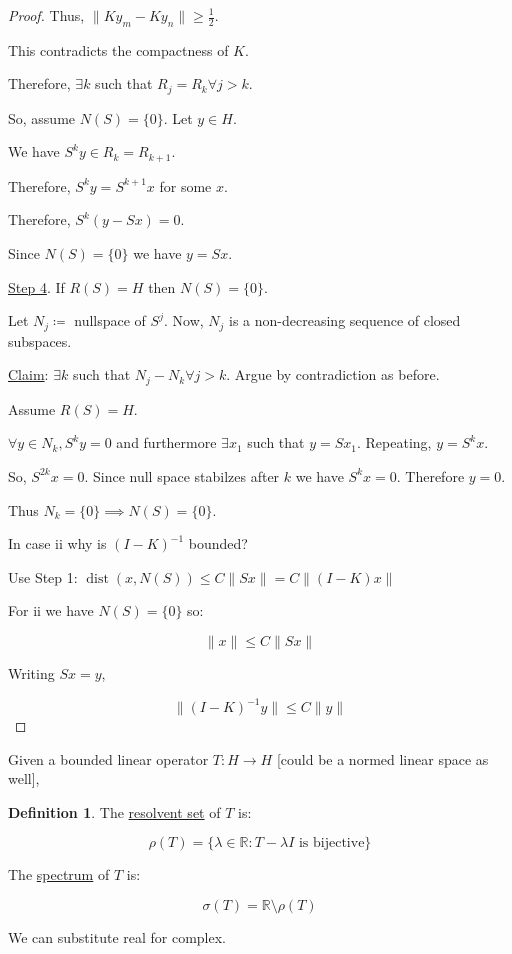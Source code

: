 \documentclass{article}
\theoremstyle{definition}
\newtheorem{definition}{Definition}
\begin{document}
\begin{proof}
Thus, \(\lVert K y_m - K y_n \rVert \geq \frac{1}{2}\).

This contradicts the compactness of \(K\). 

Therefore, \(\exists k\) such that \(R_j = R_k \forall j > k\).

So, assume \(N(S) = \{ 0 \}\). Let \(y\in H\).

We have \(S^k y \in R_k = R_{k+1}\).

Therefore, \(S^k y = S^{k+1}x\) for some \(x\).

Therefore, \(S^k (y - S x) = 0\).

Since \(N(S)=\{ 0 \}\) we have \(y = S x\).

\underline{Step 4}. If \(R(S) = H\) then \(N(S) = \{ 0 \} \).

Let \(N_j \coloneqq\) nullspace of \(S^j\). Now, \(N_j\) is a non-decreasing sequence of closed subspaces.

\underline{Claim}: \(\exists k\) such that \(N_j - N_k \forall j > k\). Argue by contradiction as before.

Assume \(R(S)=H\).

\(\forall y\in N_k, S^k y = 0\) and furthermore \(\exists x_1\) such that \(y=S x_1\). Repeating, \(y = S^{k} x\).

So, \(S^{2k} x = 0\). Since null space stabilzes after \(k\) we have \(S^k x = 0\). Therefore \(y = 0\).

Thus \(N_k = \{ 0 \} \implies N(S) = \{ 0 \}\).

In case ii why is \((I - K) ^{-1} \) bounded?

Use Step 1: \(\operatorname{dist}(x, N(S)) \leq C \lVert Sx \rVert = C \lVert (I-K)x \rVert  \) 

For ii we have \(N(S)= \{ 0 \} \) so:

\[
    \lVert x \rVert \leq C \lVert S x \rVert 
\]

Writing \(S x = y\),

\[
    \lVert (I - K)^{-1} y \rVert \leq C \lVert y \rVert 
\]

\end{proof}

Given a bounded linear operator \(T: H \to H\) [could be a normed linear space as well],

\begin{definition}
    The \underline{resolvent set} of \(T\) is:
    
    \[
        \rho(T) = \{ \lambda \in \mathbb{R} : T - \lambda I \text{ is bijective} \} 
    \]

    The \underline{spectrum} of \(T\) is:

    \[
        \sigma (T) = \mathbb{R} \setminus \rho (T)
    \]

    We can substitute real for complex.
\end{definition}
\end{document}
